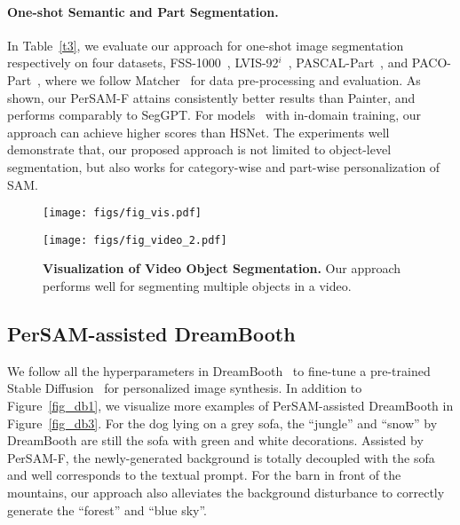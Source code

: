 \documentclass{article} \usepackage{iclr2024_conference,times}
\makeatletter
\newcommand\figcaption{\def\@captype{figure}\caption}
\makeatother
\begin{document}
\paragraph{One-shot Semantic and Part Segmentation.}
In Table~\ref{t3}, we evaluate our approach for one-shot image segmentation respectively on four datasets, FSS-1000~\citep{li2020fss}, LVIS-92$^{i}$~\citep{gupta2019lvis}, PASCAL-Part~\citep{morabia2020attention}, and PACO-Part~\citep{ramanathan2023paco}, where we follow Matcher~\citep{liu2023matcher} for data pre-processing and evaluation. As shown, our PerSAM-F attains consistently better results than Painter, and performs comparably to SegGPT. For models~\citep{min2021hypercorrelation,hong2022cost} with in-domain training, our approach can achieve higher scores than HSNet. The experiments well demonstrate that, our proposed approach is not limited to object-level segmentation, but also works for category-wise and part-wise personalization of SAM.

\begin{figure*}[t!]
\vspace{-0.2cm}
\begin{minipage}[t]{0.47\textwidth}
\texttt{[image: figs/fig\_vis.pdf]}
\figcaption{\textbf{Visualization of PerSAM-F's Improvement.} Our scale-aware fine-tuning can well alleviate the scale ambiguity of PerSAM.}
\label{fig_vis}
\end{minipage}
\hspace{0.24in}
\vspace{-0.2cm}
\begin{minipage}[t]{0.47\textwidth}
\texttt{[image: figs/fig\_video\_2.pdf]}
\figcaption{\textbf{Visualization of Video Object Segmentation.} Our approach performs well for segmenting multiple objects in a video.}
\label{fig_video}
\end{minipage}
\end{figure*}



\subsection{PerSAM-assisted DreamBooth}
\label{s4.3}

We follow all the hyperparameters in DreamBooth~\citep{ruiz2022dreambooth} to fine-tune a pre-trained Stable Diffusion~\citep{rombach2022high} for personalized image synthesis.
In addition to Figure~\ref{fig_db1}, we visualize more examples of PerSAM-assisted DreamBooth in Figure~\ref{fig_db3}. For the dog lying on a grey sofa, the ``jungle'' and ``snow'' by DreamBooth are still the sofa with green and white decorations. Assisted by PerSAM-F, the newly-generated background is totally decoupled with the sofa and well corresponds to the textual prompt. For the barn in front of the mountains, our approach also alleviates the background disturbance to correctly generate the ``forest'' and ``blue sky''.
\end{document}
